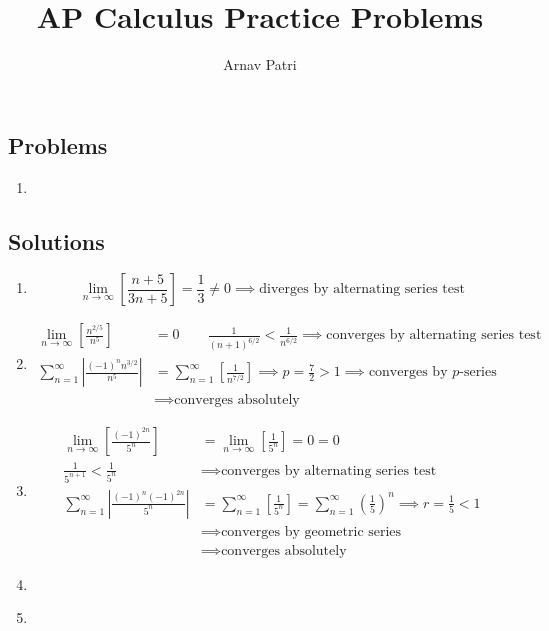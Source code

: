 \documentclass[12pt, A4]{report}
\title{AP Calculus Practice Problems}
\author{Arnav Patri}
\begin{document}
		\subsection*{Problems}
			\begin{enumerate}
				\item
			\end{enumerate}
		\subsection*{Solutions}
			\begin{enumerate}
				\item
					\[
						\lim_{n\to\infty}\left[\frac{n + 5}{3n + 5}\right] = \frac{1}{3} 
								\ne 0
								\implies \text{diverges by alternating series test}
					\]
				\item
					\begin{align*}
						\lim_{n\to\infty}\left[\frac{n^{2/5}}{n^5}\right] &= 0 
								\qquad \frac{1}{(n + 1)^{6/2}} < \frac{1}{n^{6/2}} 
									\implies \text{converges by alternating series test} \\
						\sum_{n = 1}^\infty\left|\frac{(-1)^nn^{3/2}}{n^5}\right| &= \sum_{n = 1}^\infty\left[\frac{1}{n^{7/2}}\right]
								\implies p= \frac{7}{2} > 1 
								\implies \text{converges by $p$-series} \\
							&\implies \text{converges absolutely}
					\end{align*}
				\item
					\begin{align*}
						\lim_{n\to\infty}\left[\frac{(-1)^{2n}}{5^n}\right] &= \lim_{n\to\infty}\left[\frac{1}{5^n}\right] 
								= 0 
								= 0 \\
						\frac{1}{5^{n + 1}} < \frac{1}{5^n}
										&\implies \text{converges by alternating series test} \\
						\sum_{n = 1}^\infty\left|\frac{(-1)^n(-1)^{2n}}{5^n}\right| &= \sum_{n = 1}^\infty\left[\frac{1}{5^n}\right]
								= \sum_{n = 1}^\infty\left(\frac{1}{5}\right)^n \implies r = \frac{1}{5} < 1 \\
							&\implies \text{converges by geometric series} \\
							&\implies \text{converges absolutely}
					\end{align*}
				\item
				\item
					\begin{align*}

\end{align*}
\end{enumerate}
\end{document}
